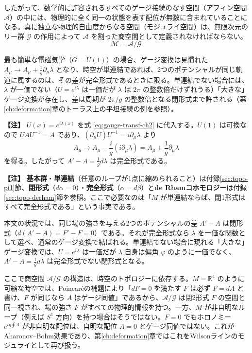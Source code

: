 \documentclass[uplatex, dvipdfmx, book]{jsbook}
\newenvironment{note}{\vspace{1ex}\par\footnotesize\noindent\textbf{【注】}}{\par\vspace{1ex}}
\begin{document}
したがって、数学的に許容されるすべてのゲージ接続のなす空間（アフィン空間 $\mathcal{A}$）の中には、物理的に全く同一の状態を表す配位が無数に含まれていることになる。真に独立な物理的自由度からなる空間（モジュライ空間）は、無限次元のリー群 $\mathcal{G}$ の作用によって $\mathcal{A}$ を割った商空間として定義されなければならない。
\begin{equation}
    \mathcal{M} = \mathcal{A} / \mathcal{G}
\end{equation}

最も簡単な電磁気学（$G = U(1)$）の場合、ゲージ変換は見慣れた $A_\mu \to A_\mu + \frac{1}{g}\partial_\mu\lambda$ となり、時空が単連結であれば、2つのポテンシャルが同じ軌道に属するのは、その差が完全形式であるときに限る。単連結でない場合には、$\lambda$ が一価でない（$U = e^{i\lambda}$ は一価だが $\lambda$ は $2\pi$ の整数倍だけずれうる）「大きな」ゲージ変換が存在し、差は周期が $2\pi/g$ の整数倍となる閉形式まで許される（第\ref{ch:deformation}章のトーラス上の平坦接続の例を参照）。

\begin{note}
$U(x) = e^{i\lambda(x)}$ を式 \eqref{eq:gauge-transf-ch2} に代入する。$U(1)$ は可換なので $U A U^{-1} = A$ であり、$(\partial_\mu U) U^{-1} = i\partial_\mu\lambda$ より
\begin{equation*}
    A_\mu \to A_\mu - \frac{i}{g}(i\partial_\mu \lambda) = A_\mu + \frac{1}{g}\partial_\mu \lambda
\end{equation*}
を得る。したがって $A' - A = \frac{1}{g}d\lambda$ は完全形式である。
\end{note}

\begin{note}
\textbf{基本群}・\textbf{単連結}（任意のループが1点に縮められること）は付録\ref{sec:topo-pi1}節、\textbf{閉形式}（$d\alpha = 0$）・\textbf{完全形式}（$\alpha = d\beta$）と\textbf{de Rhamコホモロジー}は付録\ref{sec:topo-derham}節を参照。ここで必要なのは「$M$ が単連結ならば、閉1形式はすべて完全形式である」という事実である。

本文の状況では、同じ場の強さを与える2つのポテンシャルの差 $A' - A$ は閉形式（$d(A' - A) = F' - F = 0$）である。それが完全形式なら $\lambda$ を一価な関数として選べ、通常のゲージ変換で結ばれる。単連結でない場合に現れる「大きな」ゲージ変換では、$U = e^{i\lambda}$ は一価だが $\lambda$ 自身は偏角 $\varphi$ のように一価でなく、$A' - A = \frac{1}{g}d\lambda$ は完全形式でない閉形式となる。
\end{note}

ここで商空間 $\mathcal{A}/\mathcal{G}$ の構造は、時空のトポロジーに依存する。$M = \mathbb{R}^4$ のように可縮な時空では、Poincar\'eの補題により「$dF = 0$ を満たす $F$ は必ず $F = dA$ と書け、$F$ が同じなら $A$ はゲージ同値」であるから、$\mathcal{A}/\mathcal{G}$ は閉2形式 $F$ の空間と同一視され、場の強さ $F$ がすべての物理的情報を持つ。一方、$M$ が非自明なループ（例えば $S^1$ 方向）を持つ場合はそうではない。$F = 0$ でもホロノミー $e^{ig\oint A}$ が非自明な配位は、自明な配位 $A = 0$ とゲージ同値ではない。これがAharonov--Bohm効果であり、第\ref{ch:deformation}章ではこれをWilsonラインのモジュライとして再び扱う。
\end{document}
